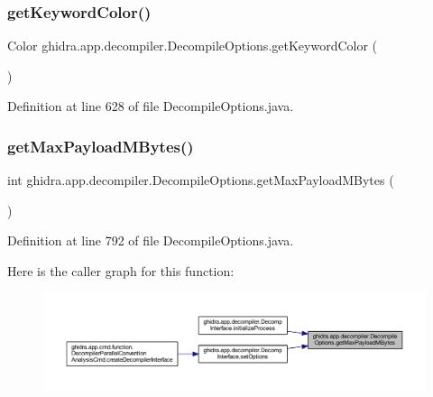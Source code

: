 \subsubsection{\texorpdfstring{getKeywordColor()}{getKeywordColor()}}
{\footnotesize\ttfamily Color ghidra.\+app.\+decompiler.\+Decompile\+Options.\+get\+Keyword\+Color (\begin{DoxyParamCaption}{ }\end{DoxyParamCaption})\hspace{0.3cm}{\ttfamily [inline]}}



Definition at line 628 of file Decompile\+Options.\+java.

\mbox{\label{classghidra_1_1app_1_1decompiler_1_1_decompile_options_a690f2f992477fa219d2be6934d6bb88c}} 
\subsubsection{\texorpdfstring{getMaxPayloadMBytes()}{getMaxPayloadMBytes()}}
{\footnotesize\ttfamily int ghidra.\+app.\+decompiler.\+Decompile\+Options.\+get\+Max\+Payload\+M\+Bytes (\begin{DoxyParamCaption}{ }\end{DoxyParamCaption})\hspace{0.3cm}{\ttfamily [inline]}}



Definition at line 792 of file Decompile\+Options.\+java.

Here is the caller graph for this function\+:
\nopagebreak
\begin{figure}[H]
\begin{center}
\leavevmode
\includegraphics[width=350pt]{classghidra_1_1app_1_1decompiler_1_1_decompile_options_a690f2f992477fa219d2be6934d6bb88c_icgraph}
\end{center}
\end{figure}
\mbox{\label{classghidra_1_1app_1_1decompiler_1_1_decompile_options_a2927ef22e8d8f4cd2a1fc0bd8d22c3e1}} 

